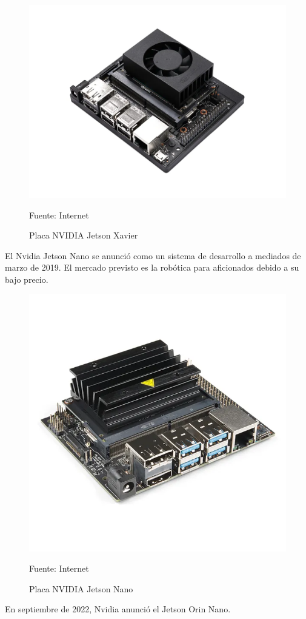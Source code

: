 \begin{figure}[H]
  \centering
  \includegraphics[scale = 0.3]{Imagenes/jetson_xavier.png}
  \caption{Placa NVIDIA Jetson Xavier}{Fuente: Internet}
\end{figure}

El Nvidia Jetson Nano se anunció como un sistema de desarrollo a mediados de marzo de 2019. El mercado previsto es la robótica para aficionados debido a su bajo precio.

\begin{figure}[H]
  \centering
  \includegraphics[scale = 0.3]{Imagenes/jetson_nano.png}
  \caption{Placa NVIDIA Jetson Nano}{Fuente: Internet}
\end{figure}

En septiembre de 2022, Nvidia anunció el Jetson Orin Nano.